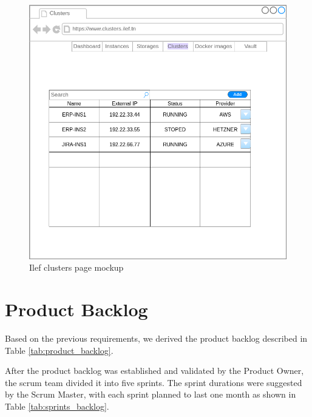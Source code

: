 \begin{figure}[h]
  \center
  \includegraphics[width=13cm]{./chapters/preliminary_study/mockup-clusters.png}
  \caption{Ilef clusters page mockup}
  \label{fig:mockup-clusters}
\end{figure}

\vspace*{3cm}
\section{Product Backlog}

Based on the previous requirements, we derived the product backlog described in Table \ref{tab:product_backlog}.

After the product backlog was established and validated by the Product Owner, the scrum team divided it into five sprints. The sprint durations were suggested by the Scrum Master, with each sprint planned to last one month as shown in Table \ref{tab:sprints_backlog}.


